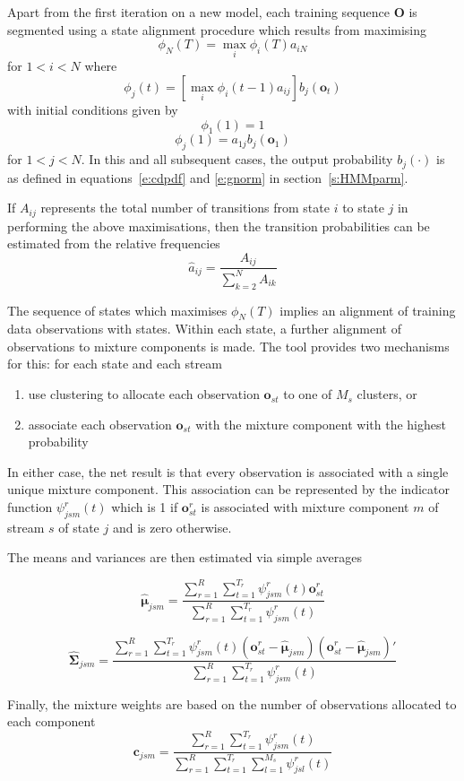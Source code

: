 Apart from the first iteration on a new model, 
each training sequence $\bm{O}$ is segmented using a state alignment procedure
which results from maximising
\[
    \phi_N(T) = \max_i \phi_i(T) a_{iN}
\]
for $1<i<N$ where
\[
  \phi_j(t) = \left[ \max_i \phi_i(t-1) a_{ij} \right] b_j(\bm{o}_t)
\]
with initial conditions given by 
\[
    \phi_1(1) = 1
\]
\[
    \phi_j(1) = a_{1j} b_j(\bm{o}_1)
\]
for $1<j<N$. 
In this and all subsequent cases, the output  probability $b_j(\cdot)$ is as defined in
equations~\ref{e:cdpdf} and \ref{e:gnorm} in section~\ref{s:HMMparm}.

If $A_{ij}$ represents the total number of transitions from state $i$ to state $j$
in performing the above maximisations, then the transition probabilities can
be estimated from the relative frequencies
\[
  \hat{a}_{ij} = \frac{A_{ij}}{\sum_{k=2}^{N}A_{ik}}
\]

The sequence of states which maximises $\phi_N(T)$ implies an alignment of
training data observations with states.  Within each state, a further alignment
of observations to mixture components is made.  The tool  provides
two mechanisms for this:  for each state and each stream
\begin{enumerate}
\item use clustering to allocate each observation $\bm{o}_{st}$ to one of $M_s$ clusters, or
\item associate each observation $\bm{o}_{st}$ with the mixture component with the
       highest probability
\end{enumerate}
In either case, the net result is that every observation is associated with a single
unique mixture component.  This association can be
represented by the indicator function $\psi^r_{jsm}(t)$ which is 1
if $\bm{o}^r_{st}$ is associated with mixture component $m$ of stream $s$ of 
state $j$ and is zero otherwise.

The means and variances are then estimated via simple averages
\newcommand{\vitsum}[2]{
                  \sum_{r=1}^R  \sum_{t=1}^{T_r} #1 \psi^r_{js#2}(t)
}

\[
   \hat{\bm{\mu}}_{jsm} = \frac{
                \vitsum{}{m}\bm{o}^r_{st}}{\vitsum{}{m}}
\]

\[
   \hat{\bm{\Sigma}}_{jsm} = \frac{
        \vitsum{}{m}(\bm{o}^r_{st} - \hat{\bm{\mu}}_{jsm})
                                        (\bm{o}^r_{st} - \hat{\bm{\mu}}_{jsm})'
                }{\vitsum{}{m}}
\]

Finally, the mixture  weights are based on the number of
observations allocated to each component
\[
   \bm{c}_{jsm} = \frac{\vitsum{}{m}}{
        \vitsum{\sum_{l=1}^{M_s}}{l} }
\]

